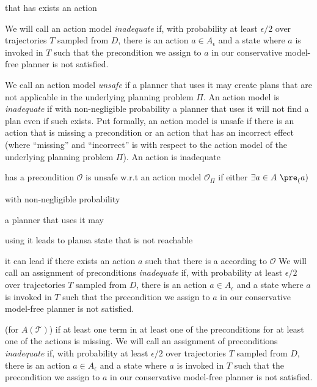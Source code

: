 that has  exists an action 

We will call an action model {\em inadequate} if, with probability at least $\epsilon/2$ over trajectories $T$ sampled from $D$, 
there is an action $a\in A_\epsilon$ and a state where $a$ is invoked in $T$ such that the precondition we assign to $a$ in our conservative model-free planner is not satisfied. 



We call an action model {\em unsafe} 
if a planner that uses it may create plans that are not applicable in the underlying planning problem $\Pi$. An action model is {\em inadequate} if with non-negligible probability 
a planner that uses it will not find a plan even if such exists. 
Put formally, an action model is unsafe if there is an action 
that is missing a precondition or an action  that has an incorrect effect (where ``missing'' and ``incorrect'' is with respect to the action model of the underlying planning problem $\Pi$). 
An action is inadequate 

has a precondition 
$\mathcal{O}$ is unsafe w.r.t an action model $\mathcal{O}_\Pi$
if either $\exists a\in A ~ \pre_(a)$

with non-negligible probability

a planner that uses it may

using it leads to plansa state that is not reachable 


it can lead 
if there exists an action $a$ such that 
there is a
according to $\mathcal{O}$ 
We will call an assignment of preconditions {\em inadequate} if, with probability at least $\epsilon/2$ over trajectories $T$ sampled from $D$, 
there is an action $a\in A_\epsilon$ and a state where $a$ is invoked in $T$ such that the precondition we assign to $a$ in our conservative model-free planner is not satisfied. 

(for $A(\mathcal{T})$) 
if at least one term  in at least one of the preconditions 
for at least one of the actions is missing. 
We will call an assignment of preconditions {\em inadequate} if, with probability at least $\epsilon/2$ over trajectories $T$ sampled from $D$, 
there is an action $a\in A_\epsilon$ and a state where $a$ is invoked in $T$ such that the precondition we assign to $a$ in our conservative model-free planner is not satisfied. 





